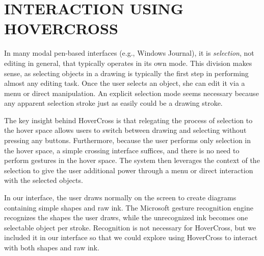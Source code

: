 \documentclass{article}
\begin{document}



\section{INTERACTION USING HOVERCROSS}

In many modal pen-based interfaces (e.g., Windows Journal), it is
\textit{selection}, not editing in general, that typically
operates in its own mode.  This division makes sense, as selecting
objects in a drawing is typically the first step in performing almost
any editing task.  Once the user selects an object, she can edit it
via a menu or direct manipulation.  An explicit selection mode seems
necessary because any apparent selection stroke just as easily could
be a drawing stroke.

The key insight behind HoverCross is that relegating the process of
selection to the hover space allows users to switch between
drawing and selecting without pressing any buttons.  Furthermore,
because the user performs only selection in the hover space, a simple
crossing interface suffices, and there is no need to perform gestures
in the hover space.  The system then leverages the context of the
selection to give the user additional power through a menu or direct interaction with the selected
objects.

In our interface, the user draws normally on the screen to create
diagrams containing simple shapes and raw ink.  The Microsoft gesture 
recognition engine recognizes the shapes the
user draws, while the unrecognized ink becomes one selectable object per stroke.
Recognition is not necessary for HoverCross, but we included it in our interface so that we could explore 
using HoverCross to interact with both shapes and raw ink.
\end{document}
